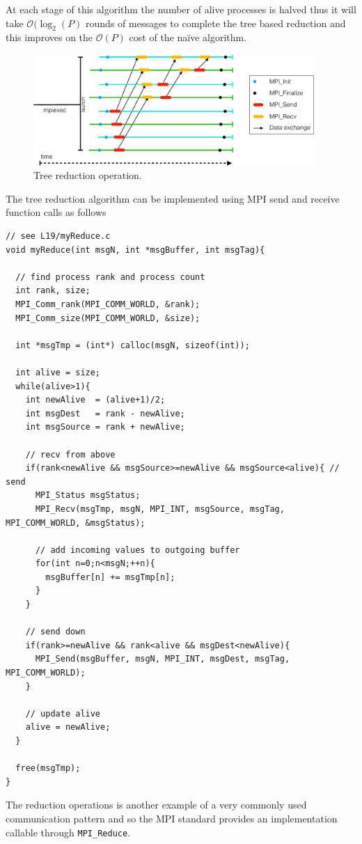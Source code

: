 At each stage of this algorithm the number of alive processes is halved thus it will take $\mathcal{O}(\log_2(P)$ rounds of messages to complete the tree based reduction and this improves on the $\mathcal{O}(P)$ cost of the na\"{i}ve algorithm. 



\begin{figure}[htbp!]
    \centering
    \includegraphics[width=0.95\textwidth]{figures/L19/CMDA3634FA19Reduction-crop.pdf}
    \caption{Tree reduction operation.}
    \label{reduction.fig}
\end{figure}

The tree reduction algorithm can be implemented using MPI send and receive function calls as follows

\begin{verbatim}
// see L19/myReduce.c
void myReduce(int msgN, int *msgBuffer, int msgTag){

  // find process rank and process count                          
  int rank, size;
  MPI_Comm_rank(MPI_COMM_WORLD, &rank);
  MPI_Comm_size(MPI_COMM_WORLD, &size);

  int *msgTmp = (int*) calloc(msgN, sizeof(int));

  int alive = size;
  while(alive>1){
    int newAlive  = (alive+1)/2;
    int msgDest   = rank - newAlive;
    int msgSource = rank + newAlive;

    // recv from above              
    if(rank<newAlive && msgSource>=newAlive && msgSource<alive){ // send                                
      MPI_Status msgStatus;
      MPI_Recv(msgTmp, msgN, MPI_INT, msgSource, msgTag, MPI_COMM_WORLD, &msgStatus);

      // add incoming values to outgoing buffer                    
      for(int n=0;n<msgN;++n){
        msgBuffer[n] += msgTmp[n];
      }
    }

    // send down                           
    if(rank>=newAlive && rank<alive && msgDest<newAlive){
      MPI_Send(msgBuffer, msgN, MPI_INT, msgDest, msgTag, MPI_COMM_WORLD);
    }

    // update alive        
    alive = newAlive;
  }

  free(msgTmp);
}
\end{verbatim}
The reduction operations is another example of a very commonly used communication pattern and so the MPI standard provides an implementation callable through \texttt{MPI\_Reduce}.

